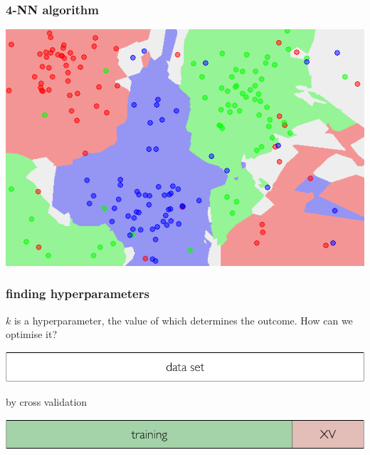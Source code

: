 \documentclass[USenglish,pdftex,compress,10pt,svgnamesi]{beamer}%
\begin{document}
\begin{frame}
\frametitle{4-NN algorithm}

 \includegraphics[width=\textwidth]{knn5}

\end{frame}



\begin{frame}
\frametitle{finding hyperparameters}

$k$ is a hyperparameter, the value of which determines the outcome.
How can we optimise it?

\bigskip
 \includegraphics[scale=0.5]{xv0}

\pause
\bigskip
by cross validation

 \includegraphics[scale=0.5]{xv1}

\end{frame}
\end{document}
